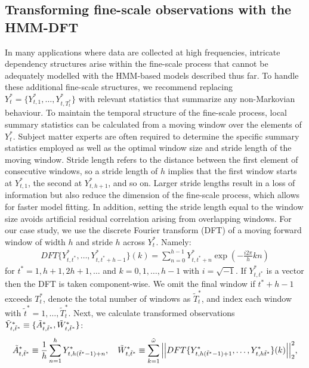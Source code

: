 \subsection{Transforming fine-scale observations with the HMM-DFT}
\label{subsec:STFT}

In many applications where data are collected at high frequencies, intricate dependency structures arise within the fine-scale process that cannot be adequately modelled with the HMM-based models described thus far. 
To handle these additional fine-scale structures, we recommend replacing $Y_t^* = \{Y^*_{t,1},\ldots,Y^*_{t,T^*_t}\}$ with relevant statistics that summarize any non-Markovian behaviour. To maintain the temporal structure of the fine-scale process, local summary statistics can be calculated from a moving window over the elements of $Y_t^*$. Subject matter experts are often required to determine the specific summary statistics employed as well as the optimal window size and stride length of the moving window. Stride length refers to the distance between the first element of consecutive windows, so a stride length of $h$ implies that the first window starts at $Y^*_{t,1}$, the second at $Y^*_{t,h+1}$, and so on. Larger stride lengths result in a loss of information but also reduce the dimension of the fine-scale process, which allows for faster model fitting. In addition, setting the stride length equal to the window size avoids artificial residual correlation arising from overlapping windows. For our case study, we use the discrete Fourier transform (DFT) of a moving forward window of width $h$ and stride $h$ across $Y^*_t$. Namely:
%
\begin{align}
    DFT\{Y^*_{t,t^*},\ldots, Y^*_{t,t^*+h-1}\}(k) = \sum_{n=0}^{h-1} Y^*_{t,t^*+n}\exp\left(-\frac{i 2\pi}{h} kn \right)
    \label{eq:DFTdef}
\end{align}
%
for $t^* = 1,h+1,2h+1,\ldots$ and $k = 0, 1, \ldots, h-1$ with $i = \sqrt{-1}$. If $Y^*_{t,t^*}$ is a vector then the DFT is taken component-wise. We omit the final window if $t^*+h-1$ exceeds $T^*_t$, denote the total number of windows as $\tilde T^*_t$, and index each window with $\tilde{t}^* = 1,\ldots,\tilde T^*_t$. Next, we calculate transformed observations $\tilde{Y}^*_{t,\tilde{t}^*} \equiv \{\tilde{A}^*_{t,\tilde{t}^*},\tilde{W}^*_{t,\tilde{t}^*}\}$:
%
\begin{equation}
    \label{eqn:z}
    \Zone_{t,\tilde{t}^*} \equiv \frac{1}{h}\sum_{n=1}^{h}Y^*_{t,h(\tilde{t}^*-1)+n}, \quad \Ztwo_{t,\tilde{t}^*} \equiv \sum_{k=1}^{\tilde{\omega}}\Big|\Big|DFT\{Y^*_{t,h(\tilde{t}^*-1)+1},\ldots, Y^*_{t,h\tilde{t}^*}\}(k)\Big|\Big|_2^2,
\end{equation}
